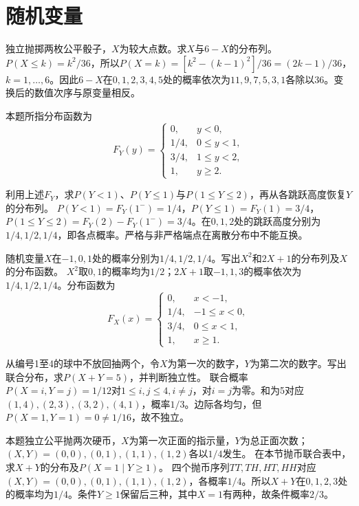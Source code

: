 \par\addvspace{12pt}

\section{随机变量}

独立抛掷两枚公平骰子，\(X\)为较大点数。求\(X\)与\(6-X\)的分布列。
\solutionanswer
\(P(X\le k)=k^2/36\)，所以\(P(X=k)=[k^2-(k-1)^2]/36=(2k-1)/36\)，\(k=1,\ldots,6\)。因此\(6-X\)在\(0,1,2,3,4,5\)处的概率依次为\(11,9,7,5,3,1\)各除以\(36\)。变换后的数值次序与原变量相反。


本题所指分布函数为
\[
 F_Y(y)=\begin{cases}0,&y<0,\\1/4,&0\le y<1,\\3/4,&1\le y<2,\\1,&y\ge2.\end{cases}
\]

利用上述\(F_Y\)，求\(P(Y<1)\)、\(P(Y\le1)\)与\(P(1\le Y\le2)\)，再从各跳跃高度恢复\(Y\)的分布列。
\solutionanswer
\(P(Y<1)=F_Y(1^-)=1/4\)，\(P(Y\le1)=F_Y(1)=3/4\)，\(P(1\le Y\le2)=F_Y(2)-F_Y(1^-)=3/4\)。在\(0,1,2\)处的跳跃高度分别为\(1/4,1/2,1/4\)，即各点概率。严格与非严格端点在离散分布中不能互换。


随机变量\(X\)在\(-1,0,1\)处的概率分别为\(1/4,1/2,1/4\)。写出\(X^2\)和\(2X+1\)的分布列及\(X\)的分布函数。
\solutionanswer
\(X^2\)取\(0,1\)的概率均为\(1/2\)；\(2X+1\)取\(-1,1,3\)的概率依次为\(1/4,1/2,1/4\)。分布函数为
\[
 F_X(x)=\begin{cases}0,&x<-1,\\1/4,&-1\le x<0,\\3/4,&0\le x<1,\\1,&x\ge1.\end{cases}
\]


从编号1至4的球中不放回抽两个，令\(X\)为第一次的数字，\(Y\)为第二次的数字。写出联合分布，求\(P(X+Y=5)\)，并判断独立性。
\solutionanswer
联合概率\(P(X=i,Y=j)=1/12\)对\(1\le i,j\le4,i\ne j\)，对\(i=j\)为零。和为5对应\((1,4),(2,3),(3,2),(4,1)\)，概率\(1/3\)。边际各均匀，但\(P(X=1,Y=1)=0\ne1/16\)，故不独立。


本题独立公平抛两次硬币，\(X\)为第一次正面的指示量，\(Y\)为总正面次数；\((X,Y)=(0,0),(0,1),(1,1),(1,2)\)各以\(1/4\)发生。
在本节抛币联合表中，求\(X+Y\)的分布及\(P(X=1\mid Y\ge1)\)。
\solutionanswer
四个抛币序列\(TT,TH,HT,HH\)对应\((X,Y)=(0,0),(0,1),(1,1),(1,2)\)，各概率\(1/4\)。所以\(X+Y\)在\(0,1,2,3\)处的概率均为\(1/4\)。条件\(Y\ge1\)保留后三种，其中\(X=1\)有两种，故条件概率\(2/3\)。


